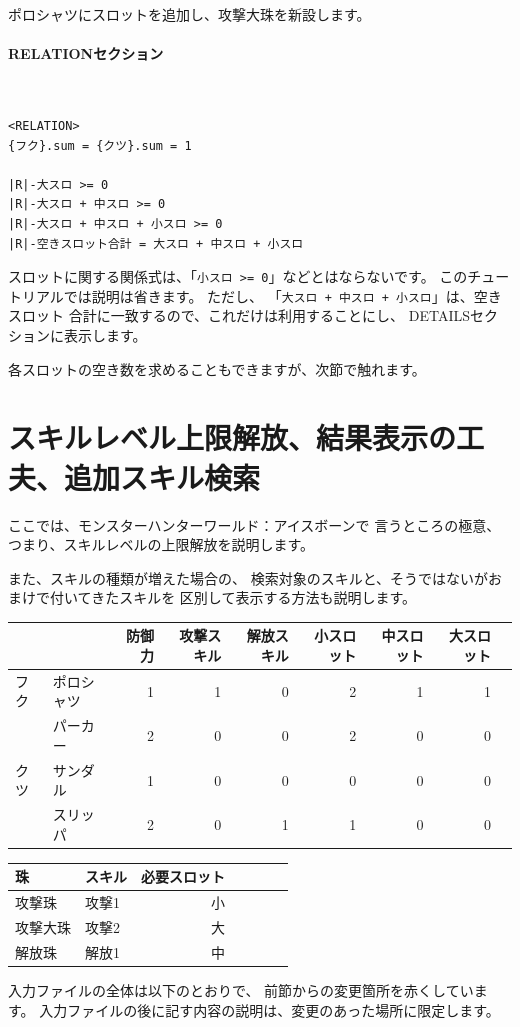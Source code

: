 \documentclass[dvipdfmx]{jsarticle}
\begin{document}
ポロシャツにスロットを追加し、攻撃大珠を新設します。

\paragraph{RELATIONセクション}~\medskip
{\footnotesize\begin{mdframed}\begin{Verbatim}[commandchars=|<>]
<RELATION>
{フク}.sum = {クツ}.sum = 1

|R|-大スロ >= 0
|R|-大スロ + 中スロ >= 0
|R|-大スロ + 中スロ + 小スロ >= 0
|R|-空きスロット合計 = 大スロ + 中スロ + 小スロ
\end{Verbatim}
\end{mdframed}}
\medskip

スロットに関する関係式は、「\texttt{小スロ >= 0}」などとはならないです。
このチュートリアルでは説明は省きます。
ただし、
「\texttt{大スロ + 中スロ + 小スロ}」は、空きスロット
合計に一致するので、これだけは利用することにし、
DETAILSセクションに表示します。

各スロットの空き数を求めることもできますが、次節で触れます。

\section{スキルレベル上限解放、結果表示の工夫、追加スキル検索} %
ここでは、モンスターハンターワールド：アイスボーンで
言うところの極意、つまり、スキルレベルの上限解放を説明します。

また、スキルの種類が増えた場合の、
検索対象のスキルと、そうではないがおまけで付いてきたスキルを
区別して表示する方法も説明します。
\medskip
%
\begin{center}
\begin{tabular}{llrrrrrrr}
\toprule
&& 防御力 & 攻撃スキル & 解放スキル & 小スロット& 中スロット& 大スロット\\
\midrule
フク
& ポロシャツ & 1 & 1 & 0 & 2 & 1 & 1\\
& パーカー   & 2 & 0 & 0 & 2 & 0 & 0\\
\midrule
クツ
& サンダル & 1 & 0 & 0 & 0 & 0 & 0\\
& スリッパ & 2 & 0 & 1 & 1 & 0 & 0\\
\bottomrule
\end{tabular}
\end{center}
%
\begin{center}
\begin{tabular}{llrrrrr}
\toprule
珠 & スキル & 必要スロット \\
\midrule
攻撃珠 & 攻撃1 & 小\\
攻撃大珠 & 攻撃2 & 大\\
解放珠 & 解放1 & 中\\
\bottomrule
\end{tabular}
\end{center}
%
入力ファイルの全体は以下のとおりで、
前節からの変更箇所を赤くしています。
入力ファイルの後に記す内容の説明は、変更のあった場所に限定します。
\medskip
\end{document}
